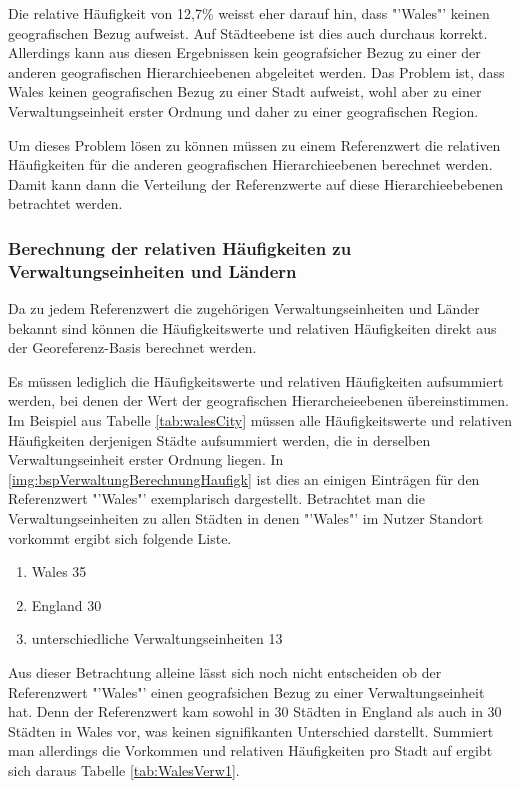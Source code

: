 			Die relative Häufigkeit von 12,7\% weisst eher darauf hin, dass "'Wales"' keinen geografischen Bezug aufweist.
			Auf Städteebene ist dies auch durchaus korrekt. 
			Allerdings kann aus diesen Ergebnissen kein geografsicher Bezug zu einer der anderen geografischen Hierarchieebenen abgeleitet werden.
			Das Problem ist, dass Wales keinen geografischen Bezug zu einer Stadt aufweist, wohl aber zu einer Verwaltungseinheit erster Ordnung und daher zu einer geografischen Region. 

			Um dieses Problem lösen zu können müssen zu einem Referenzwert die relativen Häufigkeiten für die anderen geografischen Hierarchieebenen berechnet werden.
			Damit kann dann die Verteilung der Referenzwerte auf diese Hierarchieebebenen betrachtet werden.
			
		\subsubsection{Berechnung der relativen Häufigkeiten zu Verwaltungseinheiten und Ländern} 

			Da zu jedem Referenzwert die zugehörigen Verwaltungseinheiten und Länder bekannt sind können die Häufigkeitswerte und relativen Häufigkeiten direkt aus der Georeferenz-Basis berechnet werden.

			Es müssen lediglich die Häufigkeitswerte und relativen Häufigkeiten aufsummiert werden, bei denen der Wert der geografischen Hierarcheieebenen übereinstimmen.
			Im Beispiel aus Tabelle \ref{tab:walesCity} müssen alle Häufigkeitswerte und relativen Häufigkeiten derjenigen Städte aufsummiert werden, die in derselben Verwaltungseinheit erster Ordnung liegen.
			In \ref{img:bspVerwaltungBerechnungHaufigk} ist dies an einigen Einträgen für den Referenzwert "'Wales"' exemplarisch dargestellt.
			Betrachtet man die Verwaltungseinheiten zu allen Städten in denen "'Wales"' im Nutzer Standort vorkommt ergibt sich folgende Liste.

			\begin{enumerate}
				\item Wales 35
				\item England 30
				\item unterschiedliche Verwaltungseinheiten 13
			\end{enumerate}

			Aus dieser Betrachtung alleine lässt sich noch nicht entscheiden ob der Referenzwert "'Wales"' einen geografsichen Bezug zu einer Verwaltungseinheit hat.
			Denn der Referenzwert kam sowohl in 30 Städten in England als auch in 30 Städten in Wales vor, was keinen signifikanten Unterschied darstellt. 
			Summiert man allerdings die Vorkommen und relativen Häufigkeiten pro Stadt auf ergibt sich daraus Tabelle \ref{tab:WalesVerw1}.

